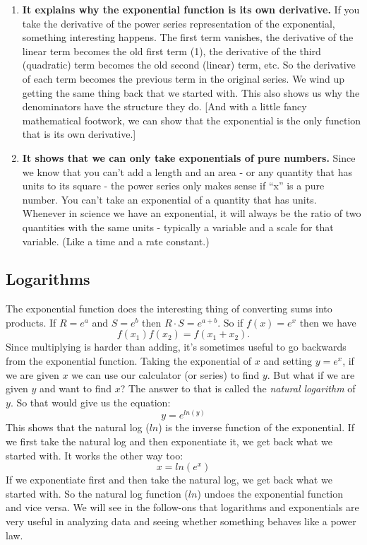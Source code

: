 \begin{enumerate}
\item \textbf{It explains why the exponential function is its own derivative.} If you take the derivative of the power series representation of the exponential, something interesting happens. The first term vanishes, the derivative of the linear term becomes the old first term (1), the derivative of the third (quadratic) term becomes the old second (linear) term, etc.  So the derivative of each term becomes the previous term in the original series.  We wind up getting the same thing back that we started with.  This also shows us why the denominators have the structure they do. [And with a little fancy mathematical footwork, we can show that the exponential is the only function that is its own derivative.]
\item \textbf{It shows that we can only take exponentials of pure numbers.} Since we know that you can't add a length and an area - or any quantity that has units to its square - the power series only makes sense if ``x''  is a pure number.  You can't take an exponential of a quantity that has units.  Whenever in science we have an exponential, it will always be the ratio of two quantities with the same units - typically a variable and a scale for that variable.  (Like a time and a rate constant.)
\end{enumerate}

\subsection*{Logarithms}
The exponential function does the interesting thing of converting sums into products.
If $R = e^{a}$ and $S = e^{b}$ then $R \cdot S = e^{a+b}$.
So if $f(x) = e^{x}$ then we have
\[ f(x_{1})f(x_{2}) = f(x_{1} + x_{2}). \]
Since multiplying is harder than adding, it's sometimes useful to go backwards from the exponential function. 
Taking the exponential of $x$ and setting $y = e^{x}$, if we are given $x$ we can use our calculator (or series) to find $y$.
But what if we are given $y$ and want to find $x$?
The answer to that is called the \emph{natural logarithm} of $y$.
So that would give us the equation:
\[ y = e^{ln(y)} \]
This shows that the natural log ($ln$) is the inverse function of the exponential.
If we first take the natural log and then exponentiate it, we get back what we started with.
It works the other way too:
\[ x = ln(e^{x}) \]
If we exponentiate first and then take the natural log, we get back what we started with.
So the natural log function ($ln$) undoes the exponential function and vice versa.
We will see in the follow-ons that logarithms and exponentials are very useful in analyzing data and seeing whether something behaves like a power law. 

